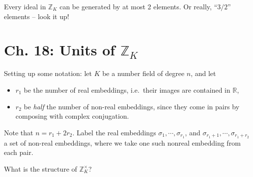 \begin{remark}

Every ideal in \({\mathbb{Z}}_K\) can be generated by at most 2
elements. Or really, ``\(3/2\)'' elements -- look it up!

\end{remark}

\hypertarget{ch.-18-units-of-mathbbz_k}{%
\section{\texorpdfstring{Ch. 18: Units of
\({\mathbb{Z}}_K\)}{Ch. 18: Units of \{\textbackslash mathbb\{Z\}\}\_K}}\label{ch.-18-units-of-mathbbz_k}}

\begin{remark}

Setting up some notation: let \(K\) be a number field of degree \(n\),
and let

\begin{itemize}
\tightlist
\item
  \(r_1\) be the number of real embeddings, i.e.~their images are
  contained in \({\mathbb{R}}\),
\item
  \(r_2\) be \emph{half} the number of non-real embeddings, since they
  come in pairs by composing with complex conjugation.
\end{itemize}

Note that \(n = r_1 + 2r_2\). Label the real embeddings
\(\sigma_1, \cdots, \sigma_{r_1}\), and
\(\sigma_{r_1+1}, \cdots, \sigma_{r_1 + r_2}\) a set of non-real
embeddings, where we take one such nonreal embedding from each pair.

\end{remark}

\begin{question}

What is the structure of \({\mathbb{Z}}_K^{\times}\)?

\end{question}

